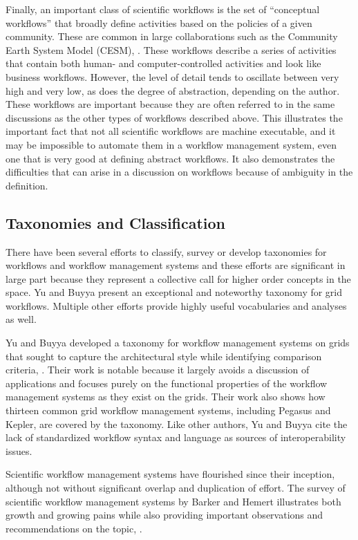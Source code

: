 Finally, an important class of scientific workflows is the set of ``conceptual workflows'' that broadly define activities based on the policies of a given community. These are common in large collaborations such as the Community Earth System Model (CESM), \cite{noauthor_cesm_nodate}. These workflows describe a series of activities that contain both human- and computer-controlled activities and look like business workflows. However, the level of detail tends to oscillate between very high and very low, as does the degree of abstraction, depending on the author. These workflows are important because they are often referred to in the same discussions as the other types of workflows described above. This illustrates the important fact that not all scientific workflows are machine executable, and it may be impossible to automate them in a workflow management system, even one that is very good at defining abstract workflows. It also demonstrates the difficulties that can arise in a discussion on workflows because of ambiguity in the definition.

\subsection{Taxonomies and
Classification}\label{taxonomies-and-classification}
There have been several efforts to classify, survey or develop taxonomies for workflows and workflow management systems and these efforts are significant in large part because they represent a collective call for higher order concepts in the space. Yu and Buyya present an exceptional and noteworthy taxonomy for grid workflows. Multiple other efforts provide highly useful vocabularies and analyses as
well.

Yu and Buyya developed a taxonomy for workflow management systems on
grids that sought to capture the architectural style while identifying
comparison criteria, \cite{yu_taxonomy_2005}. Their work is notable because it
largely avoids a discussion of applications and focuses purely on the
functional properties of the workflow management systems as they exist
on the grids. Their work also shows how thirteen common grid
workflow management systems, including Pegasus and Kepler, are covered by the
taxonomy. Like other authors, Yu and Buyya cite the lack of standardized
workflow syntax and language as sources of interoperability issues.

Scientific workflow management systems have flourished since their
inception, although not without significant overlap and duplication of
effort. The survey of scientific workflow management systems by Barker
and Hemert illustrates both growth and growing pains while also providing
important observations and recommendations on the topic,
\cite{barker_scientific_2007}.

